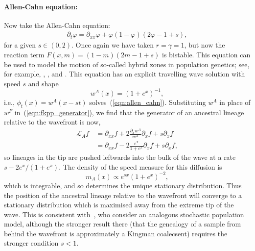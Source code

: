 \documentclass[EJP]{ejpecp} %
\newcommand{\Lgen}{\mathcal{L}}    %
\newcommand{\citet}[1]{\cite{#1}}
\begin{document}
\paragraph{Allen-Cahn equation:}
Now take the Allen-Cahn equation:
\begin{align} \label{eqn:allen_cahn}
    \partial_t\varphi = \partial_{xx}\varphi + \varphi(1-\varphi)(2\varphi-1+s),
\end{align}
for a given $s \in (0,2)$.
Once again we have taken $r=\gamma=1$, but now the reaction term
$F(x,m) = (1-m) (2m-1+s)$ is bistable.
This equation can be used to model the motion of so-called 
hybrid zones in population genetics; see, for example,
\citet{barton:1979}, \citet{gooding:2018}, and \citet{etheridge/gooding/letter:2022}.
This equation has an explicit travelling wave solution with speed $s$
and shape
\[ w^A(x) = (1+e^{x})^{-1} , \]
i.e., $\phi_t(x)=w^A(x-st)$ solves~(\ref{eqn:allen_cahn}).
Substituting $w^A$ in place of $w^F$ in~(\ref{eqn:fkpp_generator}),
we find that the generator of an ancestral lineage relative to the wavefront is now, 
\begin{align*}
\Lgen_A f
    &=
    \partial_{xx}f
    + 
    2 \frac{\partial_xw^A}{w^A} \partial_xf
    +
    s \partial_x f\\
    \qquad &=
    \partial_{xx}f
    -
    2 \frac{e^x}{1+e^x} \partial_xf 
    + 
    s \partial_xf,
\end{align*}
so lineages in the tip are pushed leftwards into the bulk of the 
wave at a rate $s-2e^x/(1+e^{x})$.
The density of the speed measure for this diffusion is
$$
    m_A(x) \propto e^{sx}(1+e^x)^{-2},
$$
which is integrable, and so determines the unique stationary distribution.
Thus the position of the ancestral lineage relative to the wavefront will converge to a stationary 
distribution which is maximised away from the extreme tip of the wave.
This is consistent with~\cite{etheridge/penington:2022}, who consider an analogous
stochastic population model, although the stronger result there (that the genealogy
of a sample from behind the wavefront is approximately a Kingman coalecsent) requires
the stronger condition $s<1$.

\end{document}
